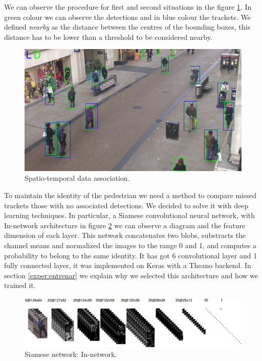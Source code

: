 We can observe the procedure for first and second situations in the figure \ref{data1}. In green colour we can observe the detections and in blue colour the trackets. We defined \textit{nearby} as the distance between the centres of the bounding boxes, this distance has to be lower than a threshold to be considered nearby. 

\begin{figure}[hptb]
\centering         
\includegraphics[width=\textwidth]{lucasKanade/dataAssociation.jpg}
\caption{Spatio-temporal data association.} \label{data1}
\end{figure}


To maintain the identity of the pedestrian we need a method to compare missed trackets those with no associated detections. We decided to solve it with deep learning techniques. In particular, a Siamese convolutional neural network, with In-network architecture in figure \ref{saimss} we can observe a diagram and the feature dimension of each layer. This network concatenates two blobs, substracts the channel means and normalized the images to the range 0 and 1, and computes a probability to belong to the same identity. It has got 6 convolutional layer and 1 fully connected layer, it was implemented on Keras with a Theano backend. In section \ref{exper:entrenar} we explain why we selected this architecture and how we trained it.



\begin{figure}[!]
\centering         
\includegraphics[width=\textwidth]{timesDiagram/network6conv.png}
\caption{Siamese network: In-network.} \label{saimss}
\end{figure}


